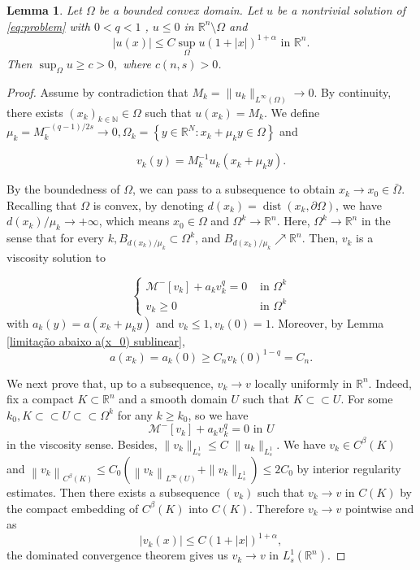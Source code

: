 \documentclass[11pt]{article}
\newtheorem{lemma}{Lemma}
\begin{document}
\begin{lemma}\label{Lemma 1 sublinear} Let $\Omega$ be a bounded convex domain.
    Let \(u\) be a nontrivial solution of \eqref{eq:problem} with $0<q<1$ , $u\le 0 $ in $\mathbb{R}^n\setminus \Omega$ and
    $$
    |u(x)|\leq C\sup_\Omega u(1+|x|)^{1+\alpha} \mbox{ in }\mathbb{R}^n.
    $$
    Then
   $
    \sup_\Omega u\geq c>0,
    $
where $c(n,s)>0$.
    
\end{lemma}
\begin{proof}
Assume by contradiction that 
$M_k=\|u_k\|_{L^\infty(\Omega)}\rightarrow 0$. 
By continuity, there exists $\left(x_k\right)_{k \in \mathbb{N}} \in \Omega$ such that $u\left(x_k\right)=M_k$. We define $\mu_k=M_k^{-(q-1) / 2 s} \rightarrow 0, \Omega_k=\left\{y \in \mathbb{R}^N: x_k+\mu_k y \in \Omega\right\}$ and

$$
v_k(y)=M_k^{-1} u_k\left(x_k+\mu_k y\right).
$$

By the boundedness of $\Omega$, we can pass to a subsequence to obtain $x_k \rightarrow x_0 \in \bar{\Omega}$. Recalling that  $\Omega$ is convex, by denoting $d(x_k)=\operatorname{dist}(x_k, \partial \Omega)$, we have $d(x_k) / \mu_k \rightarrow+\infty$, which means $x_0 \in \Omega$ and  $\Omega^k \rightarrow \mathbb{R}^n$.
Here, $\Omega^k \rightarrow \mathbb{R}^n$ in the sense that for every $k, B_{d\left(x_k\right) / \mu_k} \subset \Omega^k$, and $B_{d\left(x_k\right) / \mu_k} \nearrow \mathbb{R}^n$.
Then, $v_k$ is a viscosity solution to

$$
\begin{cases}\mathcal{M}^{-}[v_k] + a_{k}v_{k}^q=0 & \text { in } \Omega^k \\ v_k\geq 0 & \text { in } \Omega^k\end{cases}
$$
with $a_k(y)=a(x_k+\mu_k y)$ and $v_k \leq 1, v_k(0)=1$.  Moreover, by Lemma \ref{limitação abaixo a(x_0) sublinear}, 
$$
a(x_k)=a_k(0)\geq C_nv_k(0)^{1-q}=C_n.
$$  

We next prove that, up to a subsequence, $v_k \rightarrow v$ locally uniformly in $\mathbb{R}^n$.
Indeed, fix a compact $K \subset \mathbb{R}^n$ and a smooth domain $U$ such that $K \subset \subset U$. For some $k_0, K \subset \subset U \subset \subset \Omega^k$ for any $k \geq k_0$, so we have
$$
\mathcal{M}^{-}[v_k] + a_{k}v_{k}^q=0 \text { in } U
$$
in the viscosity sense. 
Besides,
$
\|v_k\|_{L^1_s} \le C\,\, \|u_k\|_{L^1_s}.$
We have $v_k \in C^\beta(K)$ and $\left\|v_k\right\|_{C^\beta(K)} \leq C_0(\left\|v_k\right\|_{L^{\infty}(U)}+\|v_k\|_{L^1_s}) \leq 2C_0$ by interior regularity estimates. 
 Then there exists a subsequence $\left(v_k\right)$ such that $v_k \rightarrow v$ in $C(K)$ by the compact embedding of $C^\beta(K)$ into $C(K)$. Therefore $v_k \rightarrow v$ pointwise and as  
$$
|v_k(x)|\leq C(1+|x|)^{1+\alpha},
$$
 the dominated convergence theorem gives us $v_k \rightarrow v$ in $L_{s}^1\left(\mathbb{R}^n\right)$.


\end{proof}
\end{document}
